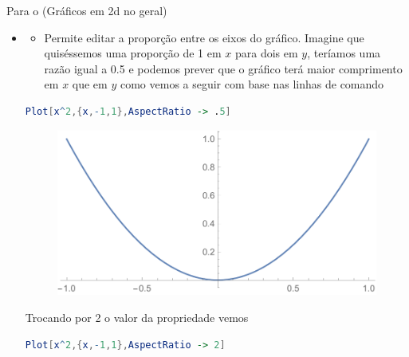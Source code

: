 \documentclass[a4paper, 12pt]{article}
\begin{document}
	\vspace{.5cm}
	Para o  (Gráficos em 2d no geral) 
	\begin{itemize}
		\item{}
		\begin{itemize}
			\item Permite editar a proporção entre os eixos do gráfico. Imagine que quiséssemos uma proporção de 1 em $x$ para dois em $y$, teríamos uma razão igual a 0.5 e podemos prever que o gráfico terá maior comprimento em $x$ que em $y$ como vemos a seguir com base nas linhas de comando
		\end{itemize}
	
\begin{lstlisting}[language=Mathematica]
Plot[x^2,{x,-1,1},AspectRatio -> .5]
\end{lstlisting}
		
		\begin{figure}[!h]\label{parabola}
			\centering
			\includegraphics[scale=.55]{images/aspecthalf}
		\end{figure}
		
		Trocando por 2 o valor da propriedade vemos
		
\begin{lstlisting}[language=Mathematica]
Plot[x^2,{x,-1,1},AspectRatio -> 2]
\end{lstlisting}
		

\end{itemize}
\end{document}
